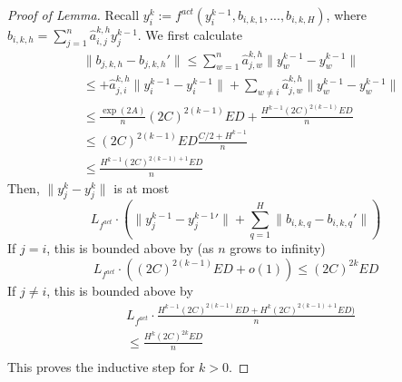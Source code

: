 \documentclass[11pt,a4paper]{article}
\begin{document}
\begin{proof}[Proof of Lemma]
Recall $y_i^k := f^{act}(y_i^{k-1}, b_{i,k,1}, ..., b_{i,k,H})$, where $b_{i,k,h} = \sum_{j=1}^n \hat{a}_{i,j}^{k,h} y_j^{k-1}$.
We first calculate
\begin{align*}
& \|b_{j,k,h} - b_{j,k,h}'\|  \leq \sum_{w=1}^n \hat{a}_{j,w}^{k,h} \|y_w^{k-1} - y_w^{k-1}\| \\
& \leq + \hat{a}_{j,i}^{k,h} \|y_i^{k-1} - y_i^{k-1}\|  + \sum_{w \neq i} \hat{a}_{j,w}^{k,h} \|y_w^{k-1} - y_w^{k-1}\|  \\
& \leq \frac{\exp(2A)}{n}  (2C)^{2(k-1)} ED + \frac{H^{k-1}(2C)^{2(k-1)}ED}{n} \\
& \leq (2C)^{2(k-1)}ED \frac{C/2   + H^{k-1} }{n} \\
& \leq \frac{H^{k-1} (2C)^{2(k-1)+1} ED}{n}
\end{align*}
Then, $\|y_j^k - {y_j^k}\|$ is at most
\begin{equation}
L_{f^{act}} \cdot \left(\|y_j^{k-1}-y_j^{k-1}'\| + \sum_{q=1}^H \|b_{i,k,q} - b_{i,k,q}'\|\right)
\end{equation}
If $j= i$, this is bounded above by (as $n$ grows to infinity)
\begin{equation}
L_{f^{act}} \cdot ((2C)^{2(k-1)}ED + o(1)) \leq (2C)^{2k}ED
\end{equation}
If $j\neq i$, this is bounded above by
\begin{align*}
  &  L_{f^{act}} \cdot \frac{H^{k-1} (2C)^{2(k-1)}ED + H^{k} (2C)^{2(k-1)+1} ED)}{n} \\
  &  \leq  \frac{H^{k} (2C)^{2k} ED}{n} \\
\end{align*} 
This proves the inductive step for $k>0$.
\end{proof}


\end{document}
